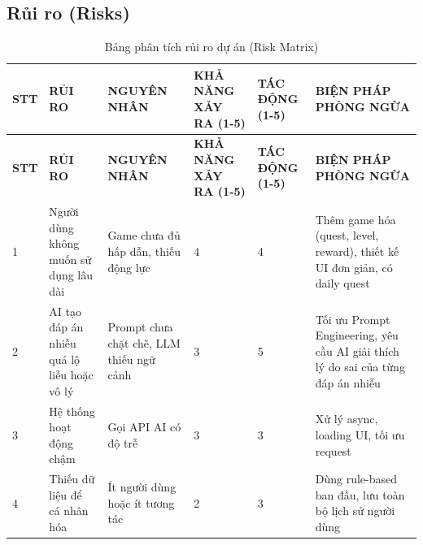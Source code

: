 \subsection{Rủi ro (Risks)}
\renewcommand{\arraystretch}{1.6} 


\begin{xltabular}{\textwidth}{|S|P|P|C|C|P|}
    \caption{Bảng phân tích rủi ro dự án (Risk Matrix)}
    \label{tab:rui-ro} \\
    \hline
    
    \textbf{STT} & \centering\arraybackslash \textbf{RỦI RO} & \centering\arraybackslash \textbf{NGUYÊN NHÂN} & \textbf{KHẢ NĂNG XẢY RA (1-5)} & \textbf{TÁC ĐỘNG (1-5)} & \centering\arraybackslash \textbf{BIỆN PHÁP PHÒNG NGỪA} \\ \hline
    \endfirsthead
    
    \hline
    \textbf{STT} & \centering\arraybackslash \textbf{RỦI RO} & \centering\arraybackslash \textbf{NGUYÊN NHÂN} & \textbf{KHẢ NĂNG XẢY RA (1-5)} & \textbf{TÁC ĐỘNG (1-5)} & \centering\arraybackslash \textbf{BIỆN PHÁP PHÒNG NGỪA} \\ \hline
    \endhead
    
    1 & Người dùng không muốn sử dụng lâu dài & Game chưa đủ hấp dẫn, thiếu động lực & 4 & 4 & Thêm game hóa (quest, level, reward), thiết kế UI đơn giản, có daily quest \\ \hline
    
    2 & AI tạo đáp án nhiễu quá lộ liễu hoặc vô lý & Prompt chưa chặt chẽ, LLM thiếu ngữ cảnh & 3 & 5 & Tối ưu Prompt Engineering, yêu cầu AI giải thích lý do sai của từng đáp án nhiễu \\ \hline
    
    3 & Hệ thống hoạt động chậm & Gọi API AI có độ trễ & 3 & 3 & Xử lý async, loading UI, tối ưu request \\ \hline
    
    4 & Thiếu dữ liệu để cá nhân hóa & Ít người dùng hoặc ít tương tác & 2 & 3 & Dùng rule-based ban đầu, lưu toàn bộ lịch sử người dùng \\ \hline
    

\end{xltabular}
